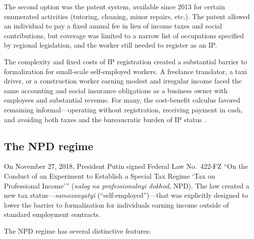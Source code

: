 \documentclass[12pt]{article}
\begin{document}
The second option was the patent system, available since 2013 for certain enumerated activities (tutoring, cleaning, minor repairs, etc.). The patent allowed an individual to pay a fixed annual fee in lieu of income taxes and social contributions, but coverage was limited to a narrow list of occupations specified by regional legislation, and the worker still needed to register as an IP.

The complexity and fixed costs of IP registration created a substantial barrier to formalization for small-scale self-employed workers. A freelance translator, a taxi driver, or a construction worker earning modest and irregular income faced the same accounting and social insurance obligations as a business owner with employees and substantial revenue. For many, the cost-benefit calculus favored remaining informal---operating without registration, receiving payment in cash, and avoiding both taxes and the bureaucratic burden of IP status \citep{Maloney2004, Perry2007}.

\subsection{The NPD regime}

On November 27, 2018, President Putin signed Federal Law No.~422-FZ ``On the Conduct of an Experiment to Establish a Special Tax Regime `Tax on Professional Income'\thinspace'' (\textit{nalog na professionalnyi dokhod}, NPD). The law created a new tax status---\textit{samozanyatyi} (``self-employed'')---that was explicitly designed to lower the barrier to formalization for individuals earning income outside of standard employment contracts.

The NPD regime has several distinctive features:
\end{document}
